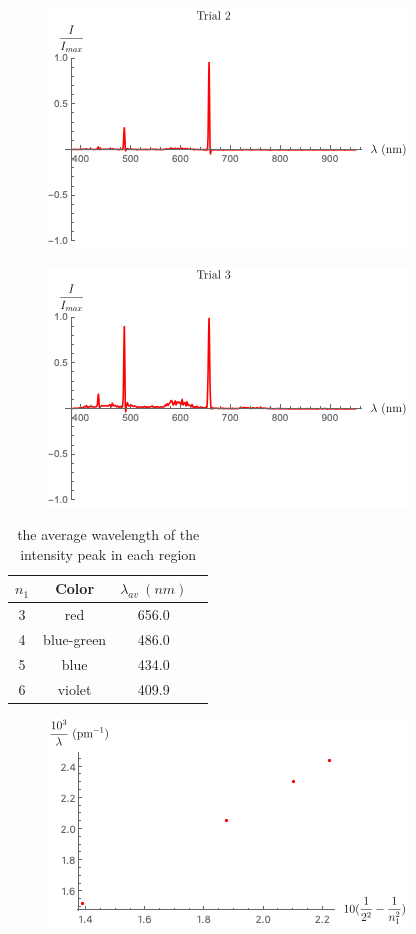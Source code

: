 \documentclass[aps,prl,preprint,groupedaddress]{revtex4-2}
\begin{document}
    \begin{figure}[h]
        \centering
		\includegraphics{trial2.png}
		\caption{}
    \end{figure}
    
    \begin{figure}[h]
        \centering
		\includegraphics{trial3.png}
		\caption{}
    \end{figure}
    
    \begin{table}[h]
        \centering
        \begin{tabular}{||c||c||c||c||} 
             \hline
             $n_1$ & Color & $\lambda_{av}~(\si{nm})$\\ [0.5ex] 
             \hline\hline
             3 & red & 656.0\\ 
             4 & blue-green & 486.0 \\
             5 & blue & 434.0 \\
             6 & violet & 409.9 \\ [1ex] 
             \hline
        \end{tabular}
        \caption{the average wavelength of the intensity peak in each region}
    \end{table}
    
    \begin{figure}[h]
        \centering
		\includegraphics{data.png}
		\caption{}
    \end{figure}
\clearpage
\end{document}

